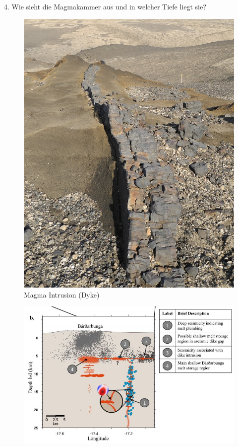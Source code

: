 \documentclass[xcolor=dvipsnames]{beamer}
\begin{document}
\begin{frame}[t]{}
\begin{block}{\LARGE 4. Wie sieht die Magmakammer aus und in welcher Tiefe liegt sie?}
\begin{minipage}{0.3\textwidth}
\begin{figure}
   \includegraphics[scale=1.07]{images/10.jpg}
	\caption{\Large Magma Intrusion (Dyke)}
  \end{figure}
  \end{minipage}
     \hfill
  \begin{minipage}{0.42\textwidth}
  \begin{figure}
   \includegraphics[scale=1.9]{images/12.jpg}

\end{figure}
\end{minipage}
\end{block}
\end{frame}
\end{document}
